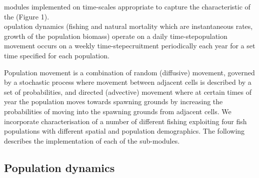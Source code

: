 \documentclass[review]{elsarticle}
\begin{document}
 modules 
implemented on time-scales appropriate to capture the characteristic of the
 (Figure 1).
\\

opulation dynamics (fishing and natural mortality which
are instantaneous rates, growth of the population biomass) operate on a daily
time-stepopulation movement occurs on a weekly
time-stepecruitment  periodically each year for a set time
 specified for each
population.

Population movement is a combination of random (diffusive) movement, governed
by a stochastic process where movement between adjacent cells is described by a
set of probabilities, and directed (advective) movement where at certain times
of year the population moves towards spawning grounds by increasing the
probabilities of moving into the spawning grounds from adjacent cells. We
incorporate characterisation of a number of different fishing
 exploiting four fish populations with different
spatial and population demographics. The following describes the implementation
of each of the sub-modules.

\subsection{Population dynamics}
\end{document}

